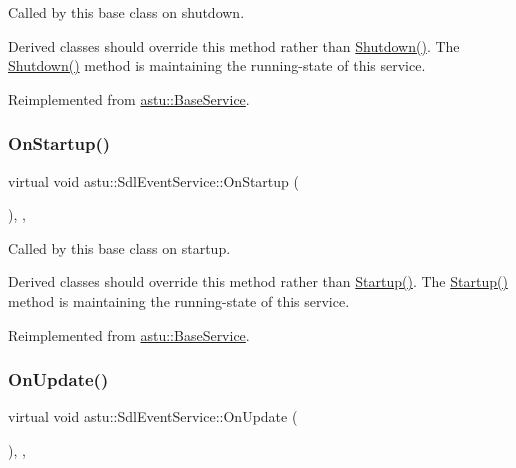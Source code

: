 Called by this base class on shutdown.

Derived classes should override this method rather than {\ttfamily \hyperlink{classastu_1_1UpdatableBaseService_a7ad7e0201007878b6014361dd5ba82f9}{Shutdown()}}. The {\ttfamily \hyperlink{classastu_1_1UpdatableBaseService_a7ad7e0201007878b6014361dd5ba82f9}{Shutdown()}} method is maintaining the running-\/state of this service. 

Reimplemented from \hyperlink{classastu_1_1BaseService_aeb5003f7c5efe5412725ac4c66942d03}{astu\+::\+Base\+Service}.

\mbox{\label{classastu_1_1SdlEventService_a71805a124600a23e48158daa5dc57fff}} 
\subsubsection{\texorpdfstring{On\+Startup()}{OnStartup()}}
{\footnotesize\ttfamily virtual void astu\+::\+Sdl\+Event\+Service\+::\+On\+Startup (\begin{DoxyParamCaption}{ }\end{DoxyParamCaption})\hspace{0.3cm}{\ttfamily [override]}, {\ttfamily [protected]}, {\ttfamily [virtual]}}

Called by this base class on startup.

Derived classes should override this method rather than {\ttfamily \hyperlink{classastu_1_1UpdatableBaseService_a47e3725f717cee3cd8983f485b2a0243}{Startup()}}. The {\ttfamily \hyperlink{classastu_1_1UpdatableBaseService_a47e3725f717cee3cd8983f485b2a0243}{Startup()}} method is maintaining the running-\/state of this service. 

Reimplemented from \hyperlink{classastu_1_1BaseService_ac8710cd2d6dcc990db65e7c8ccfbc5ff}{astu\+::\+Base\+Service}.

\mbox{\label{classastu_1_1SdlEventService_a67090f42250433506b8bfb4254df9e50}} 
\subsubsection{\texorpdfstring{On\+Update()}{OnUpdate()}}
{\footnotesize\ttfamily virtual void astu\+::\+Sdl\+Event\+Service\+::\+On\+Update (\begin{DoxyParamCaption}{ }\end{DoxyParamCaption})\hspace{0.3cm}{\ttfamily [override]}, {\ttfamily [protected]}, {\ttfamily [virtual]}}

